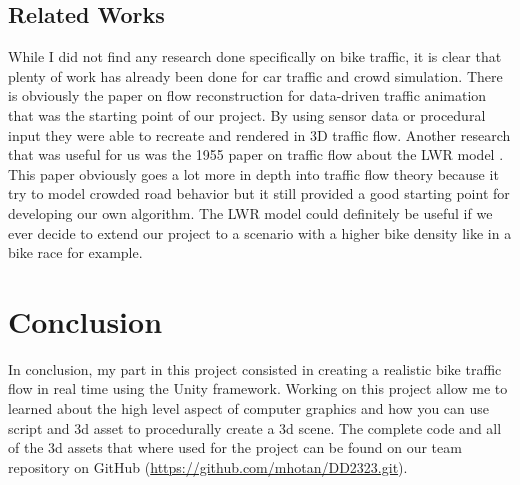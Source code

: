 \documentclass{scrartcl}
\begin{document}
    \subsection{Related Works} 
        While I did not find any research done specifically
        on bike traffic, it is clear that plenty of work has already been done for car
        traffic and crowd simulation. There is obviously the paper on flow
        reconstruction for data-driven traffic animation \citep{wilkie2013flow} that was
        the starting point of our project. By using sensor data or procedural input they
        were able to recreate and rendered in 3D traffic flow. Another research that was
        useful for us was the 1955 paper on traffic flow about the LWR model
        \citep{lighthill1955kinematic}. This paper obviously goes a lot more in depth
        into traffic flow theory because it try to model crowded road behavior but it
        still provided a good starting point for developing our own algorithm. The LWR
        model could definitely be useful if we ever decide to extend our project to a
        scenario with a higher bike density like in a bike race for example.
		
\section{Conclusion}

	In conclusion, my part in this project consisted in creating a realistic bike
	traffic flow in real time using the Unity framework. Working on this project
	allow me to learned about the high level aspect of computer graphics and how you
	can use script and 3d asset to procedurally create a 3d scene. The complete code
	and all of the 3d assets that where used for the project can be found on our
	team repository on GitHub (\url{https://github.com/mhotan/DD2323.git}).




\end{document}
